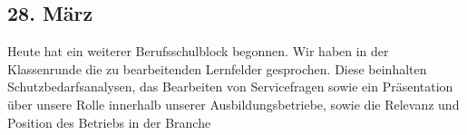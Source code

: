 \subsection{28. März}
Heute hat ein weiterer Berufsschulblock begonnen. Wir haben in der Klassenrunde die zu bearbeitenden Lernfelder gesprochen. Diese beinhalten Schutzbedarfsanalysen, das Bearbeiten von Servicefragen sowie ein Präsentation über unsere Rolle innerhalb unserer Ausbildungsbetriebe, sowie die Relevanz und Position des Betriebs in der Branche